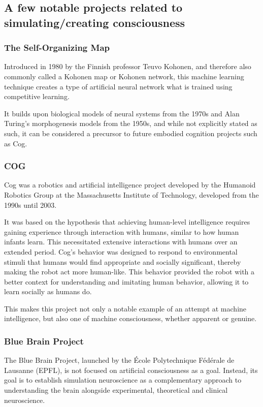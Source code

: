 \documentclass[masterthesis]{fer}
\begin{document}
\subsection{A few notable projects related to simulating/creating consciousness}
\subsubsection{The Self-Organizing Map}

Introduced in 1980 by the Finnish professor Teuvo Kohonen, and therefore also commonly called a Kohonen map or Kohonen network, this machine learning technique creates a type of artificial neural network what is trained using competitive learning.

It builds upon biological models of neural systems from the 1970s and Alan Turing's morphogenesis models from the 1950s,
\cite{Turing1952}
and while not explicitly stated as such, it can be considered a precursor to future embodied cognition projects such as Cog.
\subsubsection{COG}
Cog was a robotics and artificial intelligence project developed by the Humanoid Robotics Group at the Massachusetts Institute of Technology, developed from the 1990s until 2003.

It was based on the hypothesis that achieving human-level intelligence requires gaining experience through interaction with humans, similar to how human infants learn. This necessitated extensive interactions with humans over an extended period.
Cog's behavior was designed to respond to environmental stimuli that humans would find appropriate and socially significant, thereby making the robot act more human-like. This behavior provided the robot with a better context for understanding and imitating human behavior, allowing it to learn socially as humans do.

This makes this project not only a notable example of an attempt at machine intelligence, but also one of machine consciousness, whether apparent or genuine.

\subsubsection{Blue Brain Project}
The Blue Brain Project, launched by the École Polytechnique Fédérale de Lausanne (EPFL), is not focused on artificial consciousness as a goal. Instead, its goal is to establish simulation neuroscience as a complementary approach to understanding the brain alongside experimental, theoretical and clinical neuroscience.
\end{document}
